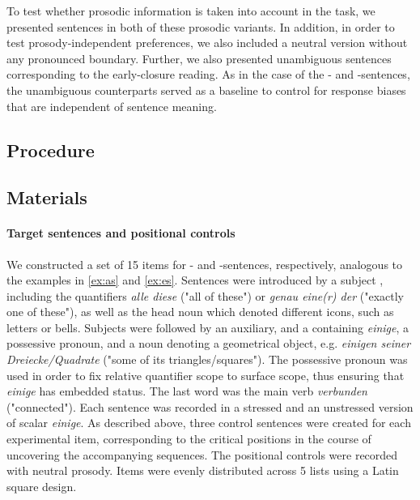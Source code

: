 \documentclass[fleqn,reqno,10pt,draft]{article}
\newcommand{\as}{\acro{as}}
\renewcommand{\es}{\acro{es}}
\begin{document}
To test whether prosodic information is taken into account in the  task, we
presented sentences in both of these prosodic variants. In addition, in order to test 
prosody-independent preferences, we also included a neutral version without any 
pronounced boundary. Further, we also presented 
unambiguous sentences corresponding to the early-closure reading. As in the case 
of the \as- and \es-sentences, the unambiguous counterparts served as a baseline to
control for response biases that are independent of sentence meaning.


\subsection{Procedure}
\label{sec:procedure}   

\subsection{Materials}
\label{sec:materials}


\paragraph{Target sentences and positional controls}

We constructed a set of 15 items for \as- and \es-sentences,
respectively, analogous to the examples in \ref{ex:as} and
\ref{ex:es}. Sentences were introduced by a subject {\small
  }, including the quantifiers {\it alle diese} ("all of
these") or {\it genau eine(r) der} ("exactly one of these"), as well
as the head noun which denoted different icons, such as letters or
bells. Subjects were followed by an auxiliary, and a {\small
  } containing {\it einige}, a possessive pronoun, and a noun
denoting a geometrical object, e.g. {\it einigen seiner
  Dreiecke/Quadrate} ("some of its triangles/squares"). The possessive
pronoun was used in order to fix relative quantifier scope to surface
scope, thus ensuring that {\it einige} has embedded status. The last
word was the main verb {\it verbunden} ("connected").  Each sentence
was recorded in a stressed and an unstressed version of scalar {\it
  einige}. As described above, three control
sentences were created for each experimental item, corresponding to
the critical positions in the course of uncovering the accompanying
sequences.  The positional controls were recorded with
neutral prosody.  Items were evenly distributed across 5 lists using a
Latin square design.
\end{document}
